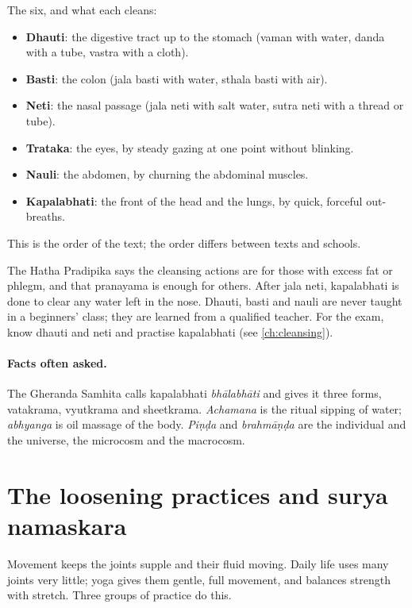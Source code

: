 The six, and what each cleans:
\begin{itemize}
\item \textbf{Dhauti}: the digestive tract up to the stomach (vaman with water, danda with a tube, vastra with a cloth).
\item \textbf{Basti}: the colon (jala basti with water, sthala basti with air).
\item \textbf{Neti}: the nasal passage (jala neti with salt water, sutra neti with a thread or tube).
\item \textbf{Trataka}: the eyes, by steady gazing at one point without blinking.
\item \textbf{Nauli}: the abdomen, by churning the abdominal muscles.
\item \textbf{Kapalabhati}: the front of the head and the lungs, by quick, forceful out-breaths.
\end{itemize}
This is the order of the text; the order differs between texts and schools.

The Hatha Pradipika says the cleansing actions are for those with excess fat or phlegm, and that pranayama is enough for others. After jala neti, kapalabhati is done to clear any water left in the nose. Dhauti, basti and nauli are never taught in a beginners' class; they are learned from a qualified teacher. For the exam, know dhauti and neti and practise kapalabhati (see \cref{ch:cleansing}).

\paragraph{Facts often asked.} The Gheranda Samhita calls kapalabhati \emph{bhālabhāti} and gives it three forms, vatakrama, vyutkrama and sheetkrama. \emph{Achamana} is the ritual sipping of water; \emph{abhyanga} is oil massage of the body. \emph{Piṇḍa} and \emph{brahmāṇḍa} are the individual and the universe, the microcosm and the macrocosm.

\section{The loosening practices and surya namaskara}
\label{ch:vyayama-intro}

Movement keeps the joints supple and their fluid moving. Daily life uses many joints very little; yoga gives them gentle, full movement, and balances strength with stretch. Three groups of practice do this.


